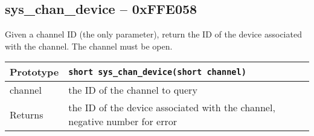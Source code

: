 \subsection*{sys\_chan\_device -- 0xFFE058}
Given a channel ID (the only parameter), return the ID of the device associated with the channel. The channel must be open.

\bigskip

\begin{tabular}{|l||l|} \hline
Prototype & \lstinline!short sys_chan_device(short channel)! \\ \hline
channel & the ID of the channel to query \\ \hline
Returns & the ID of the device associated with the channel, negative number for error \\ \hline
\end{tabular}

